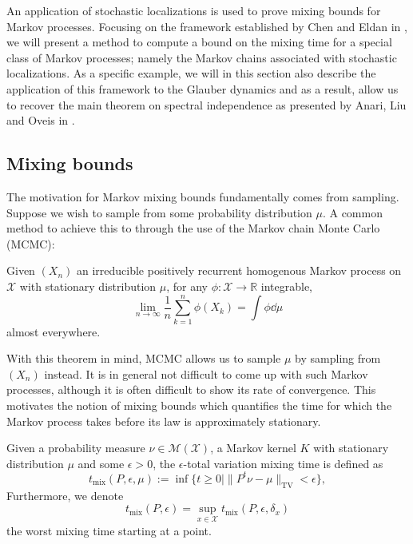 An application of stochastic localizations is used to prove mixing bounds for Markov processes. 
Focusing on the framework established by Chen and Eldan in \cite{Chen_2022}, we will present a method to 
compute a bound on the mixing time for a special class of Markov processes; namely the Markov chains 
associated with stochastic localizations. 
As a specific example, we will in this section also describe the application of this framework to the 
Glauber dynamics and as a result, allow us to recover the main theorem on spectral independence as 
presented by Anari, Liu and Oveis in \cite{Anari_2020}.

\subsection{Mixing bounds}

The motivation for Markov mixing bounds fundamentally comes from sampling. Suppose we wish to sample 
from some probability distribution $\mu$. A common method to achieve this to through the use of the 
Markov chain Monte Carlo (MCMC):
\begin{theorem}\label{thm:markov_conv}
  Given \((X_n)\) an irreducible positively recurrent homogenous Markov process on \(\mathcal{X}\) with
  stationary distribution \(\mu\), for any \(\phi : \mathcal{X} \to \mathbb{R}\) integrable, 
  \[\lim_{n \to \infty} \frac{1}{n} \sum_{k = 1}^n \phi(X_k) = \int \phi \dd \mu\]
  almost everywhere.  
\end{theorem}
With this theorem in mind, MCMC allows us to sample \(\mu\) by sampling from \((X_n)\) instead. It is in general 
not difficult to come up with such Markov processes, although it is often difficult to show its rate of convergence. 
This motivates the notion of mixing bounds which quantifies the time for which the Markov process takes before 
its law is approximately stationary.

\begin{definition}
  Given a probability measure \(\nu \in \mathcal{M}(\mathcal{X})\), a Markov kernel \(K\) with stationary 
  distribution \(\mu\) and some \(\epsilon > 0\), the \(\epsilon\)-total variation mixing time is defined as 
  \[t_{\text{mix}}(P, \epsilon, \mu) := \inf \{t \ge 0 \mid \|P^t\nu - \mu\|_{\text{TV}} < \epsilon\},\]
  Furthermore, we denote 
  \[t_{\text{mix}}(P, \epsilon) = \sup_{x \in \mathcal{X}} t_{\text{mix}}(P, \epsilon, \delta_x)\]
  the worst mixing time starting at a point.
\end{definition}

